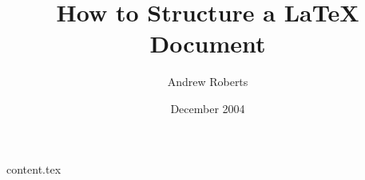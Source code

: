 \documentclass{book}
\begin{document}
\frontmatter

\title{How to Structure a LaTeX Document}
\author{Andrew Roberts}
\date{December 2004}
\maketitle


\mainmatter

{content.tex}



\backmatter
\end{document}
